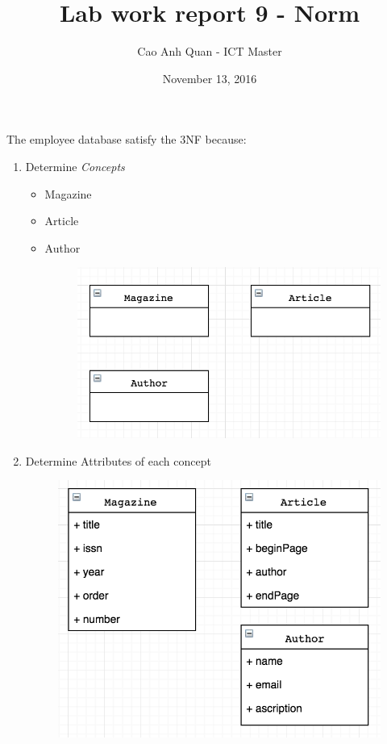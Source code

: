 \documentclass[12pt]{article}
\title{Lab work report 9 - Norm}
\author{Cao Anh Quan - ICT Master}
\date{November 13, 2016}
\begin{document}
 
\begin{titlepage}
\maketitle
\end{titlepage}

The employee database satisfy the 3NF because:

\begin{enumerate}


\item Determine \emph{Concepts}

\begin{itemize}

\item Magazine
\item Article
\item Author
\begin{figure}[H]
\includegraphics[width=\textwidth]{concept.png}
\end{figure}
\end{itemize}

\item Determine Attributes of each concept
\begin{figure}[H]
\includegraphics[width=\textwidth]{attributes.png}
\end{figure}



\end{enumerate}
\end{document}
